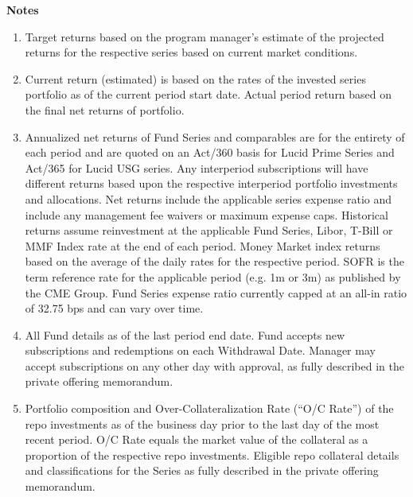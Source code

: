 \documentclass[9pt]{article}
\begin{document}
\onecolumn



\pagebreak 

\footnotesize
\noindent\textbf{\color{lucid_blue}Notes}

\begin{enumerate}
\item Target returns based on the program manager's estimate of the projected returns for the respective series based on current market conditions. 

\item Current return (estimated) is based on the rates of the invested series portfolio as of the current period start date.  Actual period return based on the final net returns of portfolio.   

\item Annualized net returns of Fund Series and comparables are for the entirety of each period and are quoted on an Act/360 basis for Lucid Prime Series and Act/365 for Lucid USG series. Any interperiod subscriptions will have different returns based upon the respective interperiod portfolio investments and allocations. Net returns include the applicable series expense ratio and include any management fee waivers or maximum expense caps. Historical returns assume reinvestment at the applicable Fund Series, Libor, T-Bill or MMF Index rate at the end of each period.  Money Market index returns based on the average of the daily rates for the respective period. SOFR is the term reference rate for the applicable period (e.g. 1m or 3m) as published by the CME Group. Fund Series expense ratio currently capped at an all-in ratio of 32.75 bps and can vary over time.

\item All Fund details as of the last period end date. Fund accepts new subscriptions and redemptions on each Withdrawal Date.  Manager may accept subscriptions on any other day with approval, as fully described in the private offering memorandum.

\item Portfolio composition and Over-Collateralization Rate (``O/C Rate'') of the repo investments as of the business day prior to the last day of the most recent period. O/C Rate equals the market value of the collateral as a proportion of the respective repo investments. Eligible repo collateral details and classifications for the Series as fully described in the private offering memorandum.

\end{enumerate}
\end{document}
